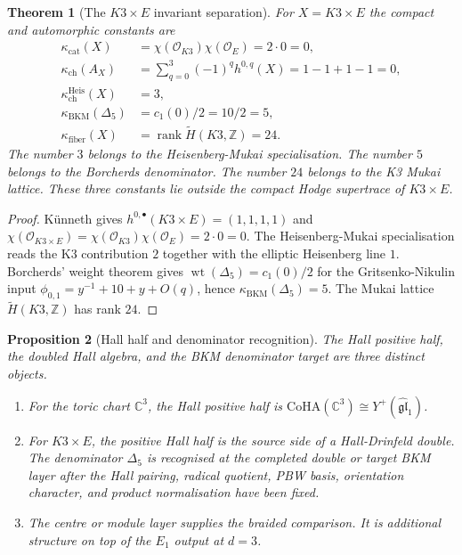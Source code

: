 \documentclass[11pt]{amsart}
\providecommand{\C}{\mathbb{C}}
\providecommand{\Z}{\mathbb{Z}}
\providecommand{\CoHA}{\mathrm{CoHA}}
\providecommand{\cO}{\mathcal{O}}
\providecommand{\kch}{\kappa_{\mathrm{ch}}}
\providecommand{\kBKM}{\kappa_{\mathrm{BKM}}}
\providecommand{\kcat}{\kappa_{\mathrm{cat}}}
\providecommand{\kfib}{\kappa_{\mathrm{fiber}}}
\providecommand{\Yph}{Y^{+}(\widehat{\mathfrak{gl}}_1)}
\providecommand{\Phion}{\phi_{0,1}}
\theoremstyle{plain}
\newtheorem{theorem}{Theorem}[section]
\newtheorem{proposition}[theorem]{Proposition}
\theoremstyle{definition}
\theoremstyle{remark}
\begin{document}
\begin{theorem}[The $K3\times E$ invariant separation]
\label{thm:k3e-invariant-separation}
For $X=K3\times E$ the compact and automorphic constants are
\[
\begin{aligned}
 \kcat(X)
 &=\chi(\cO_{K3})\chi(\cO_E)=2\cdot 0=0,\\
 \kch(A_X)
 &=\sum_{q=0}^3(-1)^q h^{0,q}(X)
   =1-1+1-1=0,\\
 \kch^{\mathrm{Heis}}(X)
 &=3,\\
 \kBKM(\Delta_5)
 &=c_1(0)/2=10/2=5,\\
 \kfib(X)
 &=\operatorname{rank}\widetilde H(K3,\Z)=24 .
\end{aligned}
\]
The number $3$ belongs to the Heisenberg-Mukai specialisation. The
number $5$ belongs to the Borcherds denominator. The number $24$
belongs to the K3 Mukai lattice. These three constants lie outside the
compact Hodge supertrace of $K3\times E$.
\end{theorem}

\begin{proof}
K\"unneth gives
$h^{0,\bullet}(K3\times E)=(1,1,1,1)$ and
$\chi(\cO_{K3\times E})=\chi(\cO_{K3})\chi(\cO_E)=2\cdot0=0$. The
Heisenberg-Mukai specialisation reads the K3 contribution $2$ together
with the elliptic Heisenberg line $1$. Borcherds' weight theorem gives
$\operatorname{wt}(\Delta_5)=c_1(0)/2$ for the Gritsenko-Nikulin input
$\Phion=y^{-1}+10+y+O(q)$, hence $\kBKM(\Delta_5)=5$. The Mukai
lattice $\widetilde H(K3,\Z)$ has rank $24$.
\end{proof}

\begin{proposition}[Hall half and denominator recognition]
\label{prop:hall-half-denominator-recognition}
The Hall positive half, the doubled Hall algebra, and the BKM
denominator target are three distinct objects.
\begin{enumerate}
\item For the toric chart $\C^3$, the Hall positive half is
$\CoHA(\C^3)\cong\Yph$.
\item For $K3\times E$, the positive Hall half is the source side of a
Hall-Drinfeld double. The denominator $\Delta_5$ is recognised at the
completed double or target BKM layer after the Hall pairing, radical
quotient, PBW basis, orientation character, and product normalisation
have been fixed.
\item The centre or module layer supplies the braided comparison. It is
additional structure on top of the $E_1$ output at $d=3$.
\end{enumerate}
\end{proposition}
\end{document}
